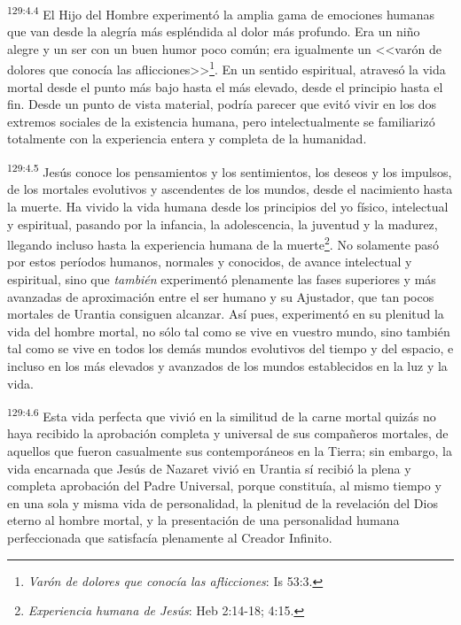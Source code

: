 \par 
\textsuperscript{129:4.4} El Hijo del Hombre experimentó la amplia gama de emociones humanas que van desde la alegría más espléndida al dolor más profundo. Era un niño alegre y un ser con un buen humor poco común; era igualmente un <<varón de dolores que conocía las aflicciones>>\footnote{\textit{Varón de dolores que conocía las aflicciones}: Is 53:3.}. En un sentido espiritual, atravesó la vida mortal desde el punto más bajo hasta el más elevado, desde el principio hasta el fin. Desde un punto de vista material, podría parecer que evitó vivir en los dos extremos sociales de la existencia humana, pero intelectualmente se familiarizó totalmente con la experiencia entera y completa de la humanidad.

\par 
\textsuperscript{129:4.5} Jesús conoce los pensamientos y los sentimientos, los deseos y los impulsos, de los mortales evolutivos y ascendentes de los mundos, desde el nacimiento hasta la muerte. Ha vivido la vida humana desde los principios del yo físico, intelectual y espiritual, pasando por la infancia, la adolescencia, la juventud y la madurez, llegando incluso hasta la experiencia humana de la muerte\footnote{\textit{Experiencia humana de Jesús}: Heb 2:14-18; 4:15.}. No solamente pasó por estos períodos humanos, normales y conocidos, de avance intelectual y espiritual, sino que \textit{también} experimentó plenamente las fases superiores y más avanzadas de aproximación entre el ser humano y su Ajustador, que tan pocos mortales de Urantia consiguen alcanzar. Así pues, experimentó en su plenitud la vida del hombre mortal, no sólo tal como se vive en vuestro mundo, sino también tal como se vive en todos los demás mundos evolutivos del tiempo y del espacio, e incluso en los más elevados y avanzados de los mundos establecidos en la luz y la vida.

\par 
\textsuperscript{129:4.6} Esta vida perfecta que vivió en la similitud de la carne mortal quizás no haya recibido la aprobación completa y universal de sus compañeros mortales, de aquellos que fueron casualmente sus contemporáneos en la Tierra; sin embargo, la vida encarnada que Jesús de Nazaret vivió en Urantia sí recibió la plena y completa aprobación del Padre Universal, porque constituía, al mismo tiempo y en una sola y misma vida de personalidad, la plenitud de la revelación del Dios eterno al hombre mortal, y la presentación de una personalidad humana perfeccionada que satisfacía plenamente al Creador Infinito.

